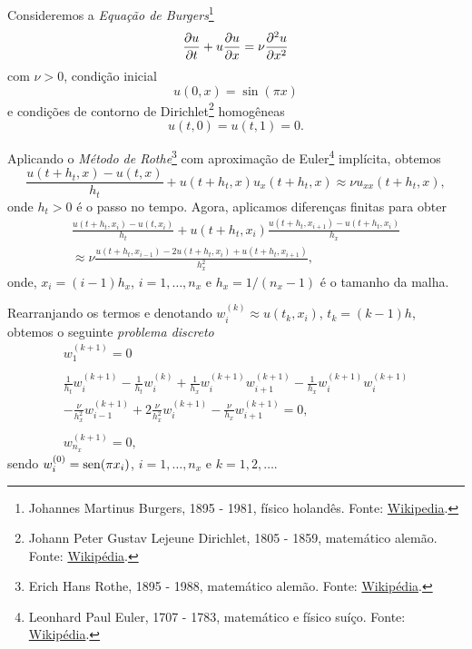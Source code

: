 \begin{ex}\label{ex:burgers}
  Consideremos a \emph{Equação de Burgers}\footnote{Johannes Martinus Burgers, 1895 - 1981, físico holandês. Fonte: \href{https://en.wikipedia.org/wiki/Jan_Burgers}{Wikipedia}.}
  \begin{equation}
    \frac{\partial u}{\partial t} + u\frac{\partial u}{\partial x} = \nu\frac{\partial^2 u}{\partial x^2}
  \end{equation}
  com $\nu>0$, condição inicial
  \begin{equation}
    u(0,x) = \sin(\pi x)
  \end{equation}
  e condições de contorno de Dirichlet\footnote{Johann Peter Gustav Lejeune Dirichlet, 1805 - 1859, matemático alemão. Fonte: \href{https://pt.wikipedia.org/wiki/Johann_Peter_Gustav_Lejeune_Dirichlet}{Wikipédia}.} homogêneas
  \begin{equation}
    u(t,0) = u(t,1) = 0.
  \end{equation}

  Aplicando o \emph{Método de Rothe}\footnote{Erich Hans Rothe, 1895 - 1988, matemático alemão. Fonte: \href{https://pt.wikipedia.org/wiki/Erich_Rothe}{Wikipédia}.} com aproximação de Euler\footnote{Leonhard Paul Euler, 1707 - 1783, matemático e físico suíço. Fonte: \href{https://pt.wikipedia.org/wiki/Leonhard_Euler}{Wikipédia}.} implícita, obtemos
  \begin{equation}
    \frac{u(t+h_t,x) - u(t,x)}{h_t} + u(t+h_t,x)u_x(t+h_t,x) \approx \nu u_{xx}(t+h_t,x),
  \end{equation}
  onde $h_t>0$ é o passo no tempo. Agora, aplicamos diferenças finitas para obter
  \begin{gather}
    \frac{u(t+h_t,x_i) - u(t,x_i)}{h_t} + u(t+h_t, x_i)\frac{u(t+h_t,x_{i+1})-u(t+h_t,x_i)}{h_x} \\
    \approx \nu\frac{u(t+h_t,x_{i-1}) - 2u(t+h_t,x_i) + u(t+h_t,x_{i+1})}{h_x^2},
  \end{gather}
  onde, $x_i=(i-1)h_x$, $i=1,\dotsc,n_x$ e $h_x=1/(n_x-1)$ é o tamanho da malha.

  Rearranjando os termos e denotando $w^{(k)}_i\approx u(t_k, x_i)$, $t_k = (k-1)h$, obtemos o seguinte \emph{problema discreto}
  \begin{gather}
    w^{(k+1)}_1 = 0\\
    ~\nonumber\\
    \frac{1}{h_t}w^{(k+1)}_i - \frac{1}{h_t}w^{(k)}_i + \frac{1}{h_x}w^{(k+1)}_iw^{(k+1)}_{i+1} - \frac{1}{h_x}w^{(k+1)}_iw^{(k+1)}_i \\
    - \frac{\nu}{h_x^2}w^{(k+1)}_{i-1} + 2\frac{\nu}{h_x^2}w^{(k+1)}_i - \frac{\nu}{h_x}w^{(k+1)}_{i+1} = 0,\\
    ~\nonumber\\
    w^{(k+1)}_{n_x} = 0,
  \end{gather}
  sendo $w^{(0)}_i = \operatorname{sen}(\pi x_i)$, $i=1,\dotsc,n_x$ e $k=1,2,\ldots$.


\end{ex}
